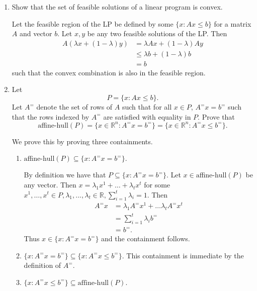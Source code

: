 \documentclass[11pt]{article}
\newcommand{\setR}{\mathbb{R}}
\renewcommand{\leq}{\leqslant}
\begin{document}
\begin{enumerate}[1)]
\begin{solution}
  \end{solution}
  
  
\item Show that the set of feasible solutions  of a linear program  is
  convex. \label{conv:item:1}
  
  \begin{solution}
  Let the feasible region of the LP be defined by some $\{x : Ax\leq b\}$ for a matrix $A$ and vector $b$. Let $x, y$ be any two feasible solutions of the LP. Then 
  \begin{align*}
  A(\lambda x + (1 - \lambda)y) & = \lambda Ax + (1- \lambda)Ay \\
  & \leq \lambda b + (1 - \lambda)b \\
  & = b
  \end{align*}
  such that the convex combination is also in the feasible region. 
  
  
  \end{solution}
  
  \item Let $$P= \{x: Ax≤b\}.$$ 
  Let $A^=$ denote the set of rows of $A$ such that for all $x \in P$, $A^= x = b^=$ such that the rows indexed by $A^=$ are satisfied with equality in $P$. 
  Prove that 
$$\text{aﬃne-hull}(P) = \{x∈\setR^n : A^=
x= b^=\}= \{x∈\setR^n : A^=
x≤b^=\}.$$


\begin{solution}
We prove this by proving three containments.
\begin{enumerate}
\item $\text{aﬃne-hull}(P) ⊆
\{x: A^=
x= b^=\}.$ 


By definition we have that $P ⊆\{x: A^=
x= b^=\}$. Let $x∈\text{aﬃne-hull}(P)$ be any vector. Then $x= λ_1x^1 +\hdots+ λ_tx^t$ for some $x^1,\hdots,x^t ∈P, λ_1,...,λ_t ∈\setR, \sum_{i=1}^t λ_i = 1$. 
Then 
\begin{align*}
A^=x & = \lambda_1 A^= x^1 + \hdots \lambda_t A^= x^t \\
& = \displaystyle\sum_{i =1}^t\lambda_i b^= \\
& = b^=.
\end{align*}
Thus $x \in \{x : A^= x = b^=\}$ and the containment follows.

\item $\{x : A^= x = b^=\} \subseteq \{x : A^= x \leq b^=\}$. This containment is immediate by the definition of $A^=$. 

\item $\{x : A^= x \leq b^=\} \subseteq \text{affine-hull}(P)$. 



\end{enumerate}
\end{solution}
\end{enumerate}
\end{document}
